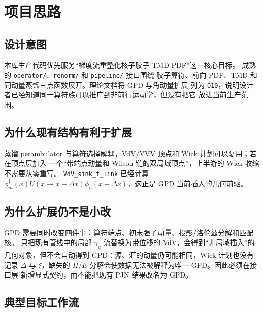 \documentclass[UTF8]{ctexart}
\begin{document}
\section{项目思路}

\subsection{设计意图}

本库生产代码优先服务“梯度流重整化核子胶子 TMD-PDF”这一核心目标。
成熟的 \texttt{operator/}、\texttt{renorm/} 和 \texttt{pipeline/} 接口围绕
胶子算符、前向 PDF、TMD 和同动量蒸馏三点函数展开。理论文档将 GPD 与角动量扩展
列为 \texttt{O10}，说明设计者已经知道同一算符族可以推广到非前行运动学，但没有把它
放进当前生产范围。 \cite{D7}

\subsection{为什么现有结构有利于扩展}

蒸馏 perambulator 与算符选择解耦，VdV/VVV 顶点和 Wick 计划可以复用；若在顶点层加入
一个“带端点动量和 Wilson 链的双局域顶点”，上半游的 Wick 收缩不需要从零重写。
\texttt{VdV\_sink\_t\_link} 已经计算
$\phi_m^\dagger(x)U(x\to x+\Delta x)\phi_n(x+\Delta x)$，这正是 GPD 当前插入的几何前驱。
\cite{C2}

\subsection{为什么扩展仍不是小改}

GPD 需要同时改变四件事：算符端点、初末强子动量、投影/洛伦兹分解和匹配核。
只把现有管线中的局部 $\gamma_\mu$ 流替换为带位移的 VdV，会得到“非局域插入”的
几何对象，但不会自动得到 GPD：源、汇的动量仍可能相同，Wick 计划也没有记录
$\Delta$ 与 $\xi$，缺失的 $H/E$ 分解会使数据无法被解释为唯一 GPD。因此必须在接口层
新增显式契约，而不能把现有 PJN 结果改名为 GPD。

\subsection{典型目标工作流}
\end{document}
